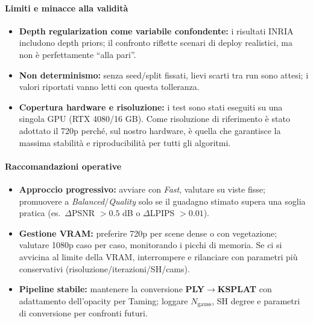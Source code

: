 \paragraph{Limiti e minacce alla validità}
\begin{itemize}
	\item \textbf{Depth regularization come variabile confondente:} i risultati INRIA includono depth priors; il confronto riflette scenari di deploy realistici, ma non è perfettamente “alla pari”.
	\item \textbf{Non determinismo:} senza seed/split fissati, lievi scarti tra run sono attesi; i valori riportati vanno letti con questa tolleranza.
	\item \textbf{Copertura hardware e risoluzione:} i test sono stati eseguiti su una singola GPU (RTX 4080/16 GB). Come risoluzione di riferimento è stato adottato il 720p perché, sul nostro hardware, è quella che garantisce la massima stabilità e riproducibilità per tutti gli algoritmi.
	
\end{itemize}

\paragraph{Raccomandazioni operative}
\begin{itemize}
	\item \textbf{Approccio progressivo:} avviare con \textit{Fast}, valutare su viste fisse; promuovere a \textit{Balanced}/\textit{Quality} solo se il guadagno stimato supera una soglia pratica (es.\ $\Delta$PSNR $>0.5$ dB o $\Delta$LPIPS $>0.01$).
	\item \textbf{Gestione VRAM:} preferire 720p per scene dense o con vegetazione; valutare 1080p caso per caso, monitorando i picchi di memoria. Se ci si avvicina al limite della VRAM, interrompere e rilanciare con parametri più conservativi (risoluzione/iterazioni/SH/cams).
	\item \textbf{Pipeline stabile:} mantenere la conversione \textbf{PLY$\rightarrow$KSPLAT} con adattamento dell’opacity per Taming; loggare $N_{\text{gauss}}$, SH degree e parametri di conversione per confronti futuri.
\end{itemize}

